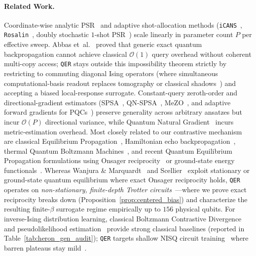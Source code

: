 \documentclass[11pt]{article}
\begin{document}
\paragraph{Related Work.}
Coordinate-wise analytic PSR~\cite{mitarai2018psr,schuld2019psr} and adaptive shot-allocation methods (\texttt{iCANS}~\cite{kubler2020icans}, \texttt{Rosalin}~\cite{arrasmith2020rosalin}, doubly stochastic $1$-shot PSR~\cite{sweke2020sgd}) scale linearly in parameter count $P$ per effective sweep. Abbas et~al.~\cite{abbas2023qbp} proved that generic exact quantum backpropagation cannot achieve classical $\mathcal{O}(1)$ query overhead without coherent multi-copy access; \texttt{QER} stays outside this impossibility theorem strictly by restricting to commuting diagonal Ising operators (where simultaneous computational-basis readout replaces tomography or classical shadows~\cite{huang2020shadows}) and accepting a biased local-response surrogate. Constant-query zeroth-order and directional-gradient estimators (SPSA~\cite{spall1992spsa,kandala2017vqe}, QN-SPSA~\cite{gacon2021qnspsa}, MeZO~\cite{malladi2023mezo}, and adaptive forward gradients for PQCs~\cite{coyle2026forward}) preserve generality across arbitrary ansatzes but incur $\mathcal{O}(P)$ directional variance, while Quantum Natural Gradient~\cite{stokes2020qng} incurs metric-estimation overhead. Most closely related to our contrastive mechanism are classical Equilibrium Propagation~\cite{scellier2017ep,laydevant2024ep,scellier2024ep}, Hamiltonian echo backpropagation~\cite{lopezpastor2023echo}, thermal Quantum Boltzmann Machines~\cite{amin2018qbm}, and recent Quantum Equilibrium Propagation formulations using Onsager reciprocity~\cite{wanjura2025qep} or ground-state energy functionals~\cite{scellier2026qep}. Whereas Wanjura \& Marquardt~\cite{wanjura2025qep} and Scellier~\cite{scellier2026qep} exploit stationary or ground-state quantum equilibrium where exact Onsager reciprocity holds, \texttt{QER} operates on \emph{non-stationary, finite-depth Trotter circuits}~\cite{farhi2014qaoa}—where we prove exact reciprocity breaks down (Proposition~\ref{prop:centered_bias}) and characterize the resulting finite-$\beta$ surrogate regime empirically up to $156$ physical qubits. For inverse-Ising distribution learning, classical Boltzmann Contrastive Divergence~\cite{hinton2002cd} and pseudolikelihood estimation~\cite{besag1975pl} provide strong classical baselines (reported in Table~\ref{tab:heron_gen_audit}); \texttt{QER} targets shallow NISQ circuit training~\cite{zhang2024quddpm,cacioppo2023qdiff,parigi2024qdiff,huang2021qgan,rudolph2022ionqgan} where barren plateaus stay mild~\cite{mcclean2018bp,cerezo2021bp,larocca2024bp}.
\end{document}
